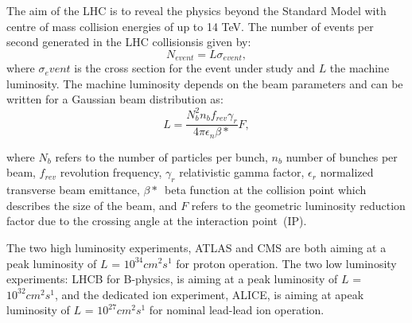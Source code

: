 \documentclass[letterpaper,12pt]{article}
\begin{document}
	The aim of the LHC is to reveal the physics beyond
	the Standard Model with centre of mass 
	collision energies of up to 14 TeV.
	The number of events per second generated in the LHC collisionsis given by:
	\[
		N_{event} = L\sigma_{event},\]
	where $\sigma_event$ is the cross section 
	for the event under study and $L$ the machine luminosity. 
	The machine luminosity depends on the beam parameters 
	and can be written for a Gaussian beam distribution as:
	\[
	L = \frac{N_b^2 n_b f_{rev} \gamma_r}{4\pi \epsilon_n \beta*} F,
	\]

	where $N_b$ refers to the number of particles per bunch,
	$n_b$ number of bunches per beam,
	$f_{rev}$ revolution frequency, 
	$\gamma_r$ relativistic gamma factor, 
	$\epsilon_r$ normalized transverse beam emittance, 
	$\beta*$~beta function at the collision point which
	describes the size of the beam, 
	and	$F$ refers to the geometric luminosity reduction factor due to the 
	crossing angle at the interaction point~(IP).

	The two high luminosity experiments, ATLAS and CMS are
	both aiming at a peak luminosity of $L$ = $10^{34}cm^2s^1$ for proton operation.
	The two low luminosity experiments: LHCB for 
	B-physics, is aiming at a peak luminosity of $L$ = $10^{32}cm^2s^1$, 
	and the dedicated ion experiment, ALICE, is aiming at apeak luminosity of
	$L$ = $10^{27}cm^2s^1$ for nominal lead-lead ion operation.
\end{document}

